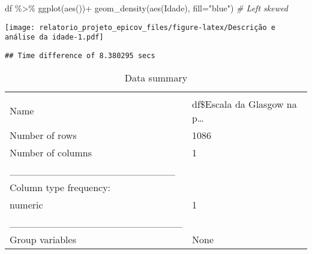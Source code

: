 \documentclass[
]{article}
\newenvironment{Shaded}{\begin{snugshade}}{\end{snugshade}}
\newcommand{\AttributeTok}[1]{\textcolor[rgb]{0.77,0.63,0.00}{#1}}
\newcommand{\CommentTok}[1]{\textcolor[rgb]{0.56,0.35,0.01}{\textit{#1}}}
\newcommand{\DecValTok}[1]{\textcolor[rgb]{0.00,0.00,0.81}{#1}}
\newcommand{\FunctionTok}[1]{\textcolor[rgb]{0.00,0.00,0.00}{#1}}
\newcommand{\NormalTok}[1]{#1}
\newcommand{\SpecialCharTok}[1]{\textcolor[rgb]{0.00,0.00,0.00}{#1}}
\newcommand{\StringTok}[1]{\textcolor[rgb]{0.31,0.60,0.02}{#1}}
\begin{document}
\begin{Shaded}
\begin{Highlighting}[]
\NormalTok{df }\SpecialCharTok{\%\textgreater{}\%} \FunctionTok{ggplot}\NormalTok{(}\FunctionTok{aes}\NormalTok{())}\SpecialCharTok{+}
  \FunctionTok{geom\_density}\NormalTok{(}\FunctionTok{aes}\NormalTok{(Idade), }\AttributeTok{fill=}\StringTok{"blue"}\NormalTok{) }\CommentTok{\# Left skewed}
\end{Highlighting}
\end{Shaded}

\texttt{[image: relatorio\_projeto\_epicov\_files/figure-latex/Descrição e análise da idade-1.pdf]}

\begin{Shaded}
\end{Shaded}

\begin{verbatim}
## Time difference of 8.380295 secs
\end{verbatim}

\begin{Shaded}
\end{Shaded}

\begin{longtable}[]{@{}ll@{}}
\caption{Data summary}\tabularnewline
\toprule
& \\
\midrule
\endfirsthead
\toprule
& \\
\midrule
\endhead
Name & df\$Escala da Glasgow na p\ldots{} \\
Number of rows & 1086 \\
Number of columns & 1 \\
\_\_\_\_\_\_\_\_\_\_\_\_\_\_\_\_\_\_\_\_\_\_\_ & \\
Column type frequency: & \\
numeric & 1 \\
\_\_\_\_\_\_\_\_\_\_\_\_\_\_\_\_\_\_\_\_\_\_\_\_ & \\
Group variables & None \\
\bottomrule
\end{longtable}
\end{document}
